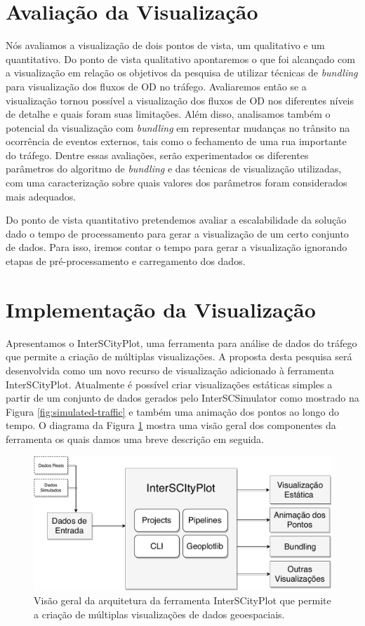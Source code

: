 \section{Avaliação da Visualização}
  Nós avaliamos a visualização de dois pontos de vista, um qualitativo e um
quantitativo. Do ponto de vista qualitativo apontaremos o que foi alcançado com
a visualização em relação os objetivos da pesquisa de utilizar técnicas de \emph{bundling}
para visualização dos fluxos de OD no tráfego. Avaliaremos então se a visualização
tornou possível a visualização dos fluxos de OD nos diferentes níveis de
detalhe e quais foram suas limitações. Além disso, analisamos também o potencial da
visualização com \emph{bundling} em representar mudanças no trânsito na
ocorrência de eventos externos, tais como o fechamento de uma rua importante do
tráfego. Dentre essas avaliações, serão experimentados os diferentes parâmetros
do algoritmo de \emph{bundling} e das técnicas de visualização utilizadas, com
uma caracterização sobre quais valores dos parâmetros foram considerados mais adequados.

  Do ponto de vista quantitativo pretendemos avaliar a escalabilidade da
solução dado o tempo de processamento para gerar a visualização de um certo
conjunto de dados. Para isso, iremos contar o tempo para gerar a visualização
ignorando etapas de pré-processamento e carregamento dos dados. 

\section{Implementação da Visualização}
  Apresentamos o InterSCityPlot, uma ferramenta para análise de dados do
tráfego que permite a criação de múltiplas visualizações. A proposta desta
pesquisa será desenvolvida como um novo recurso de visualização adicionado à
ferramenta InterSCityPlot. Atualmente é possível criar visualizações estáticas
simples a partir de um conjunto de dados gerados pelo InterSCSimulator como
mostrado na Figura \ref{fig:simulated-traffic} e também uma animação dos pontos
ao longo do tempo.  O diagrama da Figura \ref{fig:interscityplot} mostra uma
visão geral dos componentes da ferramenta os quais damos uma breve descrição em
seguida.

\begin{figure}[!htb]
  \centering
  \includegraphics[width=1\textwidth]{../figuras/interscityplot.pdf}
  \caption{Visão geral da arquitetura da ferramenta InterSCityPlot que permite a criação
de múltiplas visualizações de dados geoespaciais.}
  \label{fig:interscityplot}
\end{figure}

